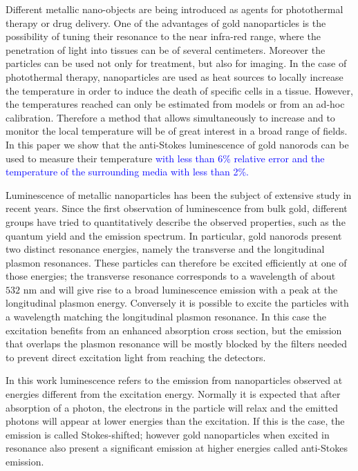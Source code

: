 \documentclass[journal=nalefd,manuscript=letter]{achemso}
\newcommand{\HI}[1]{\textcolor{blue}{#1}} %
\newcommand{\nm}{\ensuremath{\,\textrm{nm}}}
\begin{document}
Different metallic nano-objects are being introduced as agents for photothermal
therapy\cite{Huang2006,Huang2008} or drug delivery\cite{Kang2013}. One of the
advantages of gold nanoparticles is the possibility of tuning their resonance to
the near infra-red range, where the penetration of light into tissues can be of
several
centimeters\cite{Huang2006,Gobin2007,Hirsch2003,ONeal2004,Li2013c,Huang2008}.
Moreover the particles can be used not only for treatment, but also for
imaging\cite{Zhao2014a,Huang2006}. In the case of photothermal therapy,
nanoparticles are used as heat sources\cite{Gobin2007,Hirsch2003} to locally
increase the temperature in order to induce the death of specific cells in a
tissue\cite{Huang2008,Huang2006}. However, the temperatures
reached\cite{Donner2013} can only be estimated from models\cite{Zhao2014a} or
from an ad-hoc calibration. Therefore a method that allows simultaneously to
increase and to monitor the local temperature will be of great interest in a
broad range of fields. In this paper we show that the anti-Stokes luminescence
of gold nanorods can be used to measure their temperature \HI{with less than 6\% relative error 
and the temperature of the surrounding media with less than 2\%.}

Luminescence of metallic nanoparticles has been the subject of extensive study in
recent years. Since the first observation of luminescence from bulk
gold\cite{Mooradian1969}, different groups have tried to quantitatively describe
the observed properties\cite{Mohamed2000,Beversluis2003a}, such as the quantum
yield\cite{Fang2012,Rao2015,Yorulmaz2012,Cheng2015,Dulkeith2004} and the
emission spectrum\cite{Link2010}. In particular, gold nanorods present two distinct
resonance energies, namely the transverse and the longitudinal plasmon
resonances. These particles can therefore be excited efficiently at one of those
energies; the transverse resonance corresponds to a wavelength of about $532\,\nm$ and will give
rise to a broad luminescence emission with a peak at the longitudinal plasmon energy.
Conversely it is possible to excite the particles with a wavelength matching
the longitudinal plasmon resonance. In this case the excitation benefits from
an enhanced absorption cross section, but the emission that overlaps the plasmon
resonance will be mostly blocked by the filters needed to prevent direct
excitation light from reaching the detectors.

In this work luminescence refers to the emission from nanoparticles observed at
energies different from the excitation energy. Normally it is expected that
after absorption of a photon, the electrons in the particle will relax and the
emitted photons will appear at lower energies than the excitation. If this is the
case, the emission is called Stokes-shifted; however gold nanoparticles when
excited in resonance also present a significant emission at higher energies
called anti-Stokes emission\cite{Jiang2013,He2015,Carattino2016a}.
\end{document}
